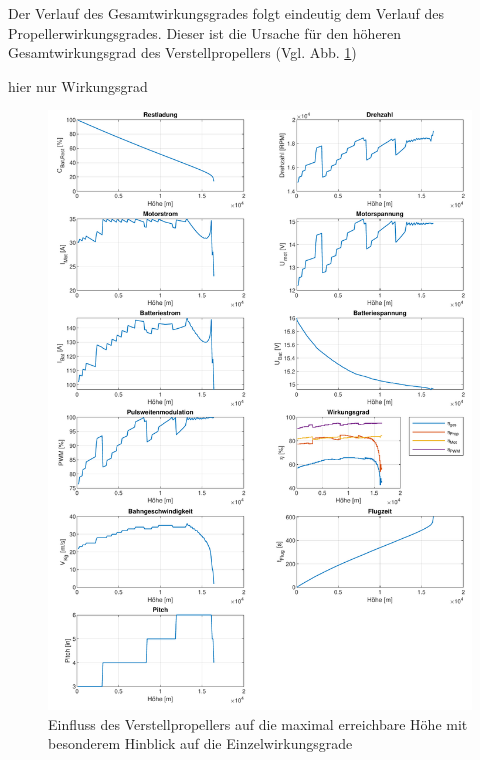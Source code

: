 \begin{appendix}
Der Verlauf des Gesamtwirkungsgrades folgt eindeutig dem Verlauf des Propellerwirkungsgrades. Dieser ist die Ursache für den höheren Gesamtwirkungsgrad des Verstellpropellers (Vgl. Abb. \ref{abb:verstellprop_eta})


hier nur Wirkungsgrad
\begin{figure}[H]
\centering
	\includegraphics[scale=0.7]{Diagramme/Verstellprop_eta.pdf}
	\caption{Einfluss des Verstellpropellers auf die maximal erreichbare Höhe mit besonderem Hinblick auf die Einzelwirkungsgrade}
	\label{abb:verstellprop_eta}
\end{figure}


\end{appendix}
